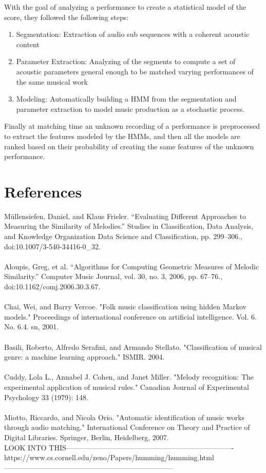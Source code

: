 \documentclass{article}
\begin{document}
	With the goal of analyzing a performance to create a statistical model of the score, they followed the following steps:
	\begin{enumerate}
		\item Segmentation: Extraction of audio sub sequences with a coherent acoustic content
		\item Parameter Extraction: Analyzing of the segments to compute a set of acoustic parameters general enough to be matched varying performances of the same musical work
		\item Modeling: Automatically building a HMM from the segmentation and parameter extraction to model music production as a stochastic process.
	\end{enumerate}
	Finally at matching time an unknown recording of a performance is preprocessed to extract the features modeled by the HMMs, and then all the models are ranked based on their probability of creating the same features of the unknown performance.
	
	\section{References}
 	Müllensiefen, Daniel, and Klaus Frieler. “Evaluating Different Approaches to Measuring the Similarity of Melodies.” Studies in Classification, Data Analysis, and Knowledge Organization Data Science and Classification, pp. 299–306., doi:10.1007/3-540-34416-0\_32.
	\\ \\
	Aloupis, Greg, et al. “Algorithms for Computing Geometric Measures of Melodic Similarity.” Computer Music Journal, vol. 30, no. 3, 2006, pp. 67–76., \\doi:10.1162/comj.2006.30.3.67.
	\\ \\
	Chai, Wei, and Barry Vercoe. "Folk music classification using hidden Markov models." Proceedings of international conference on artificial intelligence. Vol. 6. No. 6.4. sn, 2001.
	\\ \\
	Basili, Roberto, Alfredo Serafini, and Armando Stellato. "Classification of musical genre: a machine learning approach." ISMIR. 2004.
	\\ \\
	Cuddy, Lola L., Annabel J. Cohen, and Janet Miller. "Melody recognition: The experimental application of musical rules." Canadian Journal of Experimental Psychology 33 (1979): 148.
	\\ \\
	Miotto, Riccardo, and Nicola Orio. "Automatic identification of music works through audio matching." International Conference on Theory and Practice of Digital Libraries. Springer, Berlin, Heidelberg, 2007.
	\\
	LOOK INTO THIS----------------------------------------------------------------------\\
	https://www.cs.cornell.edu/zeno/Papers/humming/humming.html\\
	-----------------------------------------------------------------------
	
\end{document}
